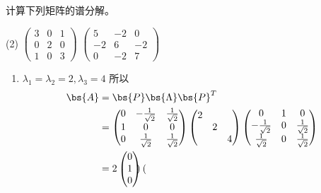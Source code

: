 \documentclass[12pt, a4paper, oneside, UTF8]{ctexbook}
\begin{document}
\begin{question}
    计算下列矩阵的谱分解。
    \begin{tasks}[label=(\arabic*)](2)
        \task $\begin{pmatrix}
            3&0&1\\
            0&2&0\\
            1&0&3
        \end{pmatrix}$
        \task $\begin{pmatrix}
            5&-2&0\\
            -2&6&-2\\
            0&-2&7
        \end{pmatrix}$
    \end{tasks}
\end{question}

\begin{solution}
    \begin{enumerate}[label=(\arabic*)]
        \item $\lambda_1=\lambda_2=2,\lambda_3=4$
        所以
        \begin{align*}
            \bs{A}&=\bs{P}\bs{\Lambda}\bs{P}^T\\
            &=\begin{pmatrix}
                0 & -\frac{1}{\sqrt{2}} &\frac{1}{\sqrt{2}} \\
                1 & 0& 0\\
                0 & \frac{1}{\sqrt{2}} &\frac{1}{\sqrt{2}}
            \end{pmatrix}
            \begin{pmatrix}
                2 & & \\
                & 2& \\
                & & 4
            \end{pmatrix}
            \begin{pmatrix}
                0 &1&0 \\
                -\frac{1}{\sqrt{2}} & 0& \frac{1}{\sqrt{2}}\\
                \frac{1}{\sqrt{2}} & 0& \frac{1}{\sqrt{2}}
            \end{pmatrix}\\
            &=2\begin{pmatrix}
                0 \\
                1\\
                0
            \end{pmatrix}\begin{pmatrix}

\end{pmatrix}
\end{align*}
\end{enumerate}
\end{solution}
\end{document}
